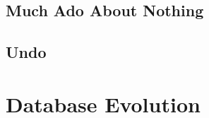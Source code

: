 \documentclass[english,submission]{programming}
\theoremstyle{definition}
\begin{document}

\subsection{Much Ado About Nothing}



\subsection{Undo}







\section{Database Evolution}\label{db-evolution}
\end{document}

